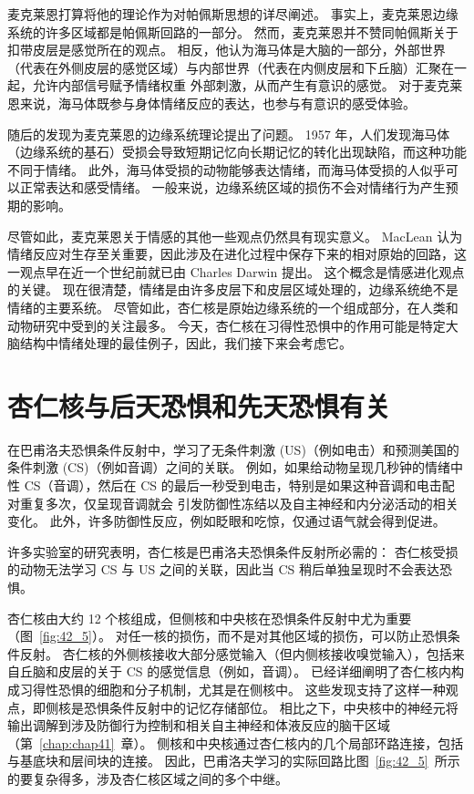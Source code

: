 麦克莱恩打算将他的理论作为对帕佩斯思想的详尽阐述。
事实上，麦克莱恩边缘系统的许多区域都是帕佩斯回路的一部分。
然而，麦克莱恩并不赞同帕佩斯关于扣带皮层是感觉所在的观点。
相反，他认为海马体是大脑的一部分，外部世界（代表在外侧皮层的感觉区域）与内部世界（代表在内侧皮层和下丘脑）汇聚在一起，允许内部信号赋予情绪权重 外部刺激，从而产生有意识的感觉。
对于麦克莱恩来说，海马体既参与身体情绪反应的表达，也参与有意识的感受体验。


随后的发现为麦克莱恩的边缘系统理论提出了问题。 1957 年，人们发现海马体（边缘系统的基石）受损会导致短期记忆向长期记忆的转化出现缺陷，而这种功能不同于情绪。
此外，海马体受损的动物能够表达情绪，而海马体受损的人似乎可以正常表达和感受情绪。
一般来说，边缘系统区域的损伤不会对情绪行为产生预期的影响。


尽管如此，麦克莱恩关于情感的其他一些观点仍然具有现实意义。
MacLean 认为情绪反应对生存至关重要，因此涉及在进化过程中保存下来的相对原始的回路，这一观点早在近一个世纪前就已由 Charles Darwin 提出。
这个概念是情感进化观点的关键。
现在很清楚，情绪是由许多皮层下和皮层区域处理的，边缘系统绝不是情绪的主要系统。
尽管如此，杏仁核是原始边缘系统的一个组成部分，在人类和动物研究中受到的关注最多。
今天，杏仁核在习得性恐惧中的作用可能是特定大脑结构中情绪处理的最佳例子，因此，我们接下来会考虑它。



\section{杏仁核与后天恐惧和先天恐惧有关}

在巴甫洛夫恐惧条件反射中，学习了无条件刺激 (US)（例如电击）和预测美国的条件刺激 (CS)（例如音调）之间的关联。
例如，如果给动物呈现几秒钟的情绪中性 CS（音调），然后在 CS 的最后一秒受到电击，特别是如果这种音调和电击配对重复多次，仅呈现音调就会 引发防御性冻结以及自主神经和内分泌活动的相关变化。
此外，许多防御性反应，例如眨眼和吃惊，仅通过语气就会得到促进。


许多实验室的研究表明，杏仁核是巴甫洛夫恐惧条件反射所必需的：
杏仁核受损的动物无法学习 CS 与 US 之间的关联，因此当 CS 稍后单独呈现时不会表达恐惧。


杏仁核由大约 12 个核组成，但侧核和中央核在恐惧条件反射中尤为重要（图~\ref{fig:42_5}）。
对任一核的损伤，而不是对其他区域的损伤，可以防止恐惧条件反射。
杏仁核的外侧核接收大部分感觉输入（但内侧核接收嗅觉输入），包括来自丘脑和皮层的关于 CS 的感觉信息（例如，音调）。
已经详细阐明了杏仁核内构成习得性恐惧的细胞和分子机制，尤其是在侧核中。
这些发现支持了这样一种观点，即侧核是恐惧条件反射中的记忆存储部位。
相比之下，中央核中的神经元将输出调解到涉及防御行为控制和相关自主神经和体液反应的脑干区域（第~\ref{chap:chap41}~章）。
侧核和中央核通过杏仁核内的几个局部环路连接，包括与基底块和层间块的连接。
因此，巴甫洛夫学习的实际回路比图~\ref{fig:42_5}~所示的要复杂得多，涉及杏仁核区域之间的多个中继。


